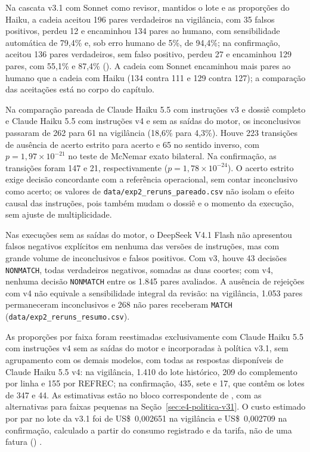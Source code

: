 Na cascata v3.1 com Sonnet como revisor, mantidos o lote e as proporções do Haiku, a cadeia aceitou 196 pares verdadeiros na vigilância, com 35 falsos positivos, perdeu 12 e encaminhou 134 pares ao humano, com sensibilidade automática de 79,4\% e, sob erro humano de 5\%, de 94,4\%; na confirmação, aceitou 136 pares verdadeiros, sem falso positivo, perdeu 27 e encaminhou 129 pares, com 55,1\% e 87,4\% (). A cadeia com Sonnet encaminhou mais pares ao humano que a cadeia com Haiku (134 contra 111 e 129 contra 127); a comparação das aceitações está no corpo do capítulo.

Na comparação pareada de Claude Haiku 5.5 com instruções v3 e dossiê completo e Claude Haiku 5.5 com instruções v4 e sem as saídas do motor, os inconclusivos passaram de 262 para 61 na vigilância (18,6\% para 4,3\%). Houve 223 transições de ausência de acerto estrito para acerto e 65 no sentido inverso, com $p=1{,}97\times10^{-21}$ no teste de McNemar exato bilateral. Na confirmação, as transições foram 147 e 21, respectivamente ($p=1{,}78\times10^{-24}$). O acerto estrito exige decisão concordante com a referência operacional, sem contar inconclusivo como acerto; os valores de \texttt{data/exp2\_reruns\_pareado.csv} não isolam o efeito causal das instruções, pois também mudam o dossiê e o momento da execução, sem ajuste de multiplicidade.

Nas execuções sem as saídas do motor, o DeepSeek V4.1 Flash não apresentou falsos negativos explícitos em nenhuma das versões de instruções, mas com grande volume de inconclusivos e falsos positivos. Com v3, houve 43 decisões \texttt{NONMATCH}, todas verdadeiros negativos, somadas as duas coortes; com v4, nenhuma decisão \texttt{NONMATCH} entre os 1.845 pares avaliados. A ausência de rejeições com v4 não equivale a sensibilidade integral da revisão: na vigilância, 1.053 pares permaneceram inconclusivos e 268 não pares receberam \texttt{MATCH} (\texttt{data/exp2\_reruns\_resumo.csv}).

As proporções por faixa foram reestimadas exclusivamente com Claude Haiku 5.5 com instruções v4 sem as saídas do motor e incorporadas à política v3.1, sem agrupamento com os demais modelos, com todas as respostas disponíveis de Claude Haiku 5.5 v4: na vigilância, 1.410 do lote histórico, 209 do complemento por linha e 155 por REFREC; na confirmação, 435, sete e 17, que contêm os lotes de 347 e 44. As estimativas estão no bloco correspondente de , com as alternativas para faixas pequenas na Seção~\ref{sec:e4-politica-v31}. O custo estimado por par no lote da v3.1 foi de US\$~0,002651 na vigilância e US\$~0,002709 na confirmação, calculado a partir do consumo registrado e da tarifa, não de uma fatura () \cite{Jardim2026phdrepo}.

